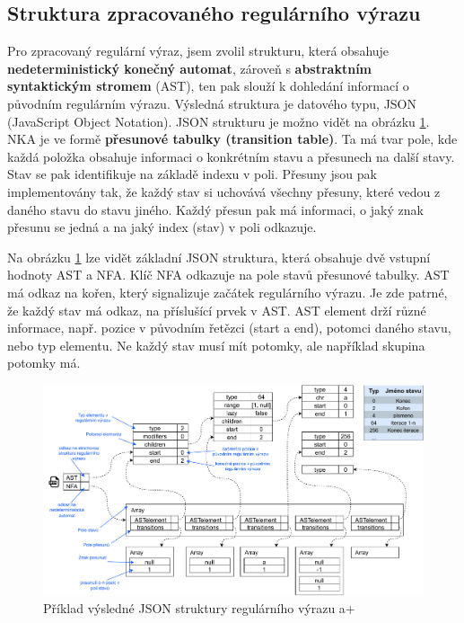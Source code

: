 \subsection*{Struktura zpracovaného regulárního výrazu}

Pro zpracovaný regulární výraz, jsem zvolil strukturu, která obsahuje \textbf{nedeterministický konečný automat}, zároveň s \textbf{abstraktním syntaktickým stromem} (AST), 
ten pak slouží k dohledání informací o původním regulárním výrazu. 
Výsledná struktura je datového typu, JSON (JavaScript Object Notation).
JSON strukturu je možno vidět na obrázku \ref{fig:JSONex}.
NKA je ve formě \textbf{přesunové tabulky (transition table)}. 
Ta má tvar pole, kde každá položka obsahuje informaci o konkrétním stavu a přesunech na další stavy.
Stav se pak identifikuje na základě indexu v poli. 
Přesuny jsou pak implementovány tak, že každý stav si uchovává všechny přesuny, které vedou z daného stavu do stavu jiného.
Každý přesun pak má informaci, o jaký znak přesunu se jedná a na jaký index (stav) v poli odkazuje. 

Na obrázku \ref{fig:JSONex} lze vidět základní JSON struktura, která obsahuje dvě vstupní hodnoty AST a NFA.
Klíč NFA odkazuje na pole stavů přesunové tabulky. 
AST má odkaz na kořen, který signalizuje začátek regulárního výrazu.
Je zde patrné, že každý stav má odkaz, na příslušící prvek v AST. 
AST element drží různé informace, např. pozice v původním řetězci (start a end), 
potomci daného stavu, nebo typ elementu. 
Ne každý stav musí mít potomky, ale například skupina potomky má.

\begin{figure}[!h]
	\centering
	\includegraphics[width=1\textwidth]{Figures/BP-JSON.pdf}
	\caption{Příklad výsledné JSON struktury regulárního výrazu a+}
	\label{fig:JSONex}
\end{figure}

